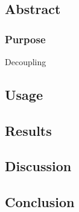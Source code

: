\chapter[CDD]{}\label{chap:01}


\setcounter{section}{-1}
\section{Abstract}

\subsection{Purpose}
Decoupling 


\section{Usage}

\section{Results}

\section{Discussion}

\section{Conclusion}





\printglossary[type=cdd]
